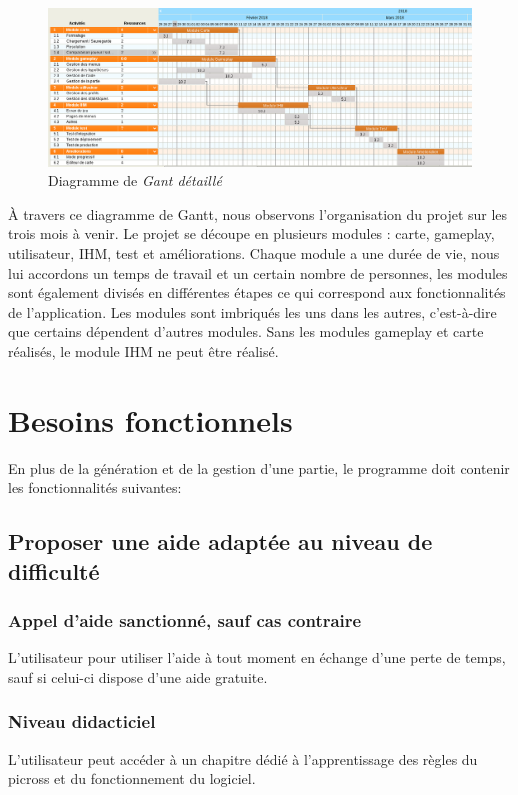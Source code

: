 \documentclass{report}
\begin{document}
    \begin{figure}[H]
	\caption{Diagramme de \textit{Gant détaillé}}
	\includegraphics[width=17cm]{ganttDetaille.png}
    \end{figure}
   
     À travers ce diagramme de Gantt, nous observons l'organisation du projet sur les trois mois à venir. Le projet se découpe en plusieurs modules : carte, gameplay, utilisateur, IHM, test et améliorations.
    Chaque module a une durée de vie, nous lui accordons un temps de travail et un certain nombre de personnes, les modules sont également divisés en différentes étapes ce qui correspond aux fonctionnalités de l'application. Les modules sont imbriqués les uns dans les autres, c'est-à-dire que certains dépendent d'autres modules. Sans les modules gameplay et carte réalisés, le module IHM ne peut être réalisé. 

   \section{Besoins fonctionnels}
   
    En plus de la génération et de la gestion d'une partie, le programme doit contenir les fonctionnalités suivantes:
    
 \setcounter{secnumdepth}{5}
 
 	\subsection{Proposer une aide adaptée au niveau de difficulté}
 		\subsubsection{Appel d'aide sanctionné, sauf cas contraire}
 				L'utilisateur pour utiliser l'aide à tout moment en échange d'une perte de temps, sauf si celui-ci dispose d'une aide gratuite.
		\subsubsection{Niveau didacticiel}
				L'utilisateur peut accéder à un chapitre dédié à l'apprentissage des règles du picross et du fonctionnement du logiciel.
\end{document}
